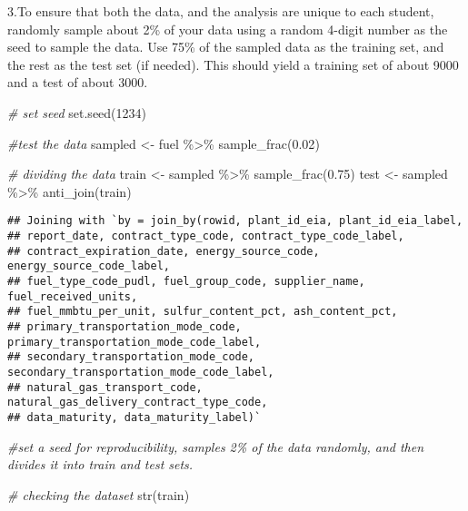 \documentclass[
]{article}
\newenvironment{Shaded}{\begin{snugshade}}{\end{snugshade}}
\newcommand{\CommentTok}[1]{\textcolor[rgb]{0.56,0.35,0.01}{\textit{#1}}}
\newcommand{\DecValTok}[1]{\textcolor[rgb]{0.00,0.00,0.81}{#1}}
\newcommand{\FloatTok}[1]{\textcolor[rgb]{0.00,0.00,0.81}{#1}}
\newcommand{\FunctionTok}[1]{\textcolor[rgb]{0.00,0.00,0.00}{#1}}
\newcommand{\NormalTok}[1]{#1}
\newcommand{\OtherTok}[1]{\textcolor[rgb]{0.56,0.35,0.01}{#1}}
\newcommand{\SpecialCharTok}[1]{\textcolor[rgb]{0.00,0.00,0.00}{#1}}
\begin{document}
3.To ensure that both the data, and the analysis are unique to each
student, randomly sample about 2\% of your data using a random 4-digit
number as the seed to sample the data. Use 75\% of the sampled data as
the training set, and the rest as the test set (if needed). This should
yield a training set of about 9000 and a test of about 3000.

\begin{Shaded}
\begin{Highlighting}[]
\CommentTok{\# set seed}
\FunctionTok{set.seed}\NormalTok{(}\DecValTok{1234}\NormalTok{)}

\CommentTok{\#test the data}
\NormalTok{sampled }\OtherTok{\textless{}{-}}\NormalTok{ fuel }\SpecialCharTok{\%\textgreater{}\%}
\FunctionTok{sample\_frac}\NormalTok{(}\FloatTok{0.02}\NormalTok{)}

\CommentTok{\# dividing the data}
\NormalTok{train }\OtherTok{\textless{}{-}}\NormalTok{ sampled }\SpecialCharTok{\%\textgreater{}\%}
\FunctionTok{sample\_frac}\NormalTok{(}\FloatTok{0.75}\NormalTok{)}
\NormalTok{test }\OtherTok{\textless{}{-}}\NormalTok{ sampled }\SpecialCharTok{\%\textgreater{}\%}
\FunctionTok{anti\_join}\NormalTok{(train)}
\end{Highlighting}
\end{Shaded}

\begin{verbatim}
## Joining with `by = join_by(rowid, plant_id_eia, plant_id_eia_label,
## report_date, contract_type_code, contract_type_code_label,
## contract_expiration_date, energy_source_code, energy_source_code_label,
## fuel_type_code_pudl, fuel_group_code, supplier_name, fuel_received_units,
## fuel_mmbtu_per_unit, sulfur_content_pct, ash_content_pct,
## primary_transportation_mode_code, primary_transportation_mode_code_label,
## secondary_transportation_mode_code, secondary_transportation_mode_code_label,
## natural_gas_transport_code, natural_gas_delivery_contract_type_code,
## data_maturity, data_maturity_label)`
\end{verbatim}

\begin{Shaded}
\begin{Highlighting}[]
\CommentTok{\#set a seed for reproducibility, samples 2\% of the data randomly, and then divides it into train and test sets.}
\end{Highlighting}
\end{Shaded}

\begin{Shaded}
\begin{Highlighting}[]
\CommentTok{\# checking the dataset}
\FunctionTok{str}\NormalTok{(train)}
\end{Highlighting}
\end{Shaded}
\end{document}
